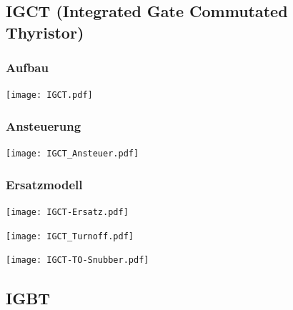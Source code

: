 \documentclass[fs, german]{latex4ei_fs}
\begin{document}
\begin{sectionbox}
\subsection{IGCT (Integrated Gate Commutated Thyristor)}
\subsubsection*{Aufbau}
\texttt{[image: IGCT.pdf]}

\subsubsection*{Ansteuerung}
\texttt{[image: IGCT\_Ansteuer.pdf]}

\subsubsection*{Ersatzmodell}
\texttt{[image: IGCT-Ersatz.pdf]}

\texttt{[image: IGCT\_Turnoff.pdf]}

\texttt{[image: IGCT-TO-Snubber.pdf]}



\end{sectionbox}

\subsection{IGBT}
\end{document}
